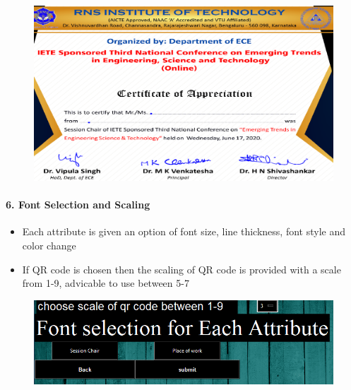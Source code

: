 \begin{figure}[H]
	\centering
	\includegraphics[width=0.8\linewidth]{"images/generation_qr_nqr/Screenshot (54)"}
	\label{fig:screenshot-54}
\end{figure}


\newpage
\paragraph{6. Font Selection and Scaling}

\begin{itemize}
	\item Each attribute is given an option of font size, line thickness, font style and color change
	\item If QR code is chosen then the scaling of QR code is provided with a scale from 1-9, advicable to use between 5-7 
\end{itemize}

\begin{figure}[H]
	\centering
	\includegraphics[width=0.85\linewidth]{"images/generation_qr_nqr/Screenshot (57)"}
	\label{fig:screenshot-57}
\end{figure}

